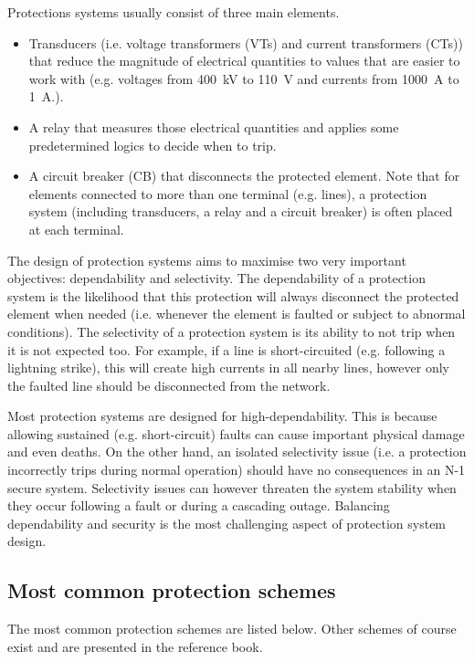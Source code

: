 Protections systems usually consist of three main elements.

\begin{itemize}
    \item Transducers (i.e. voltage transformers (VTs) and current transformers (CTs)) that reduce the magnitude of electrical quantities to values that are easier to work with (e.g. voltages from 400~kV to 110~V and currents from 1000~A to 1~A.).
    \item A relay that measures those electrical quantities and applies some predetermined logics to decide when to trip.
    \item A circuit breaker (CB) that disconnects the protected element. Note that for elements connected to more than one terminal (e.g. lines), a protection system (including transducers, a relay and a circuit breaker) is often placed at each terminal.
\end{itemize}

The design of protection systems aims to maximise two very important objectives: dependability and selectivity. The dependability of a protection system is the likelihood that this protection will always disconnect the protected element when needed (i.e. whenever the element is faulted or subject to abnormal conditions). The selectivity of a protection system is its ability to not trip when it is not expected too. For example, if a line is short-circuited (e.g. following a lightning strike), this will create high currents in all nearby lines, however only the faulted line should be disconnected from the network.

Most protection systems are designed for high-dependability. This is because allowing sustained (e.g. short-circuit) faults can cause important physical damage and even deaths. On the other hand, an isolated selectivity issue (i.e. a protection incorrectly trips during normal operation) should have no consequences in an N-1 secure system. Selectivity issues can however threaten the system stability when they occur following a fault or during a cascading outage. Balancing dependability and security is the most challenging aspect of protection system design.

\subsection{Most common protection schemes}

The most common protection schemes are listed below. Other schemes of course exist and are presented in the reference book.

